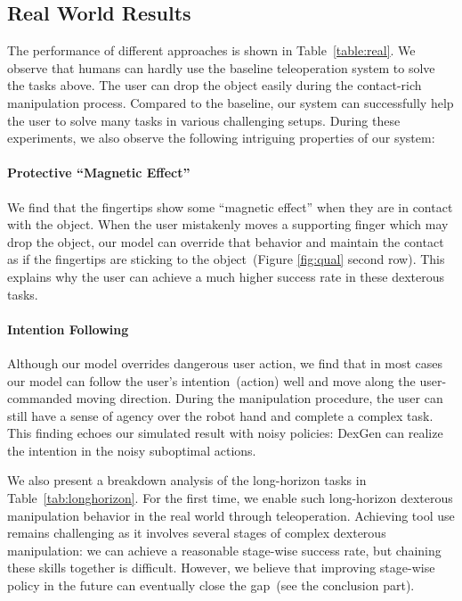 \subsection{Real World Results} The performance of different approaches is shown in Table~\ref{table:real}. We observe that humans can hardly use the baseline teleoperation system to solve the tasks above. The user can drop the object easily during the contact-rich manipulation process. Compared to the baseline, our system can successfully help the user to solve many tasks in various challenging setups. During these experiments, we also observe the following intriguing properties of our system:

\paragraph{Protective ``Magnetic Effect''} We find that the fingertips show some ``magnetic effect'' when they are in contact with the object. When the user mistakenly moves a supporting finger which may drop the object, our model can override that behavior and maintain the contact as if the fingertips are sticking to the object~(Figure \ref{fig:qual} second row). This explains why the user can achieve a much higher success rate in these dexterous tasks. 

\paragraph{Intention Following} Although our model overrides dangerous user action, we find that in most cases our model can follow the user's intention~(action) well and move along the user-commanded moving direction. During the manipulation procedure, the user can still have a sense of agency over the robot hand and complete a complex task. This finding echoes our simulated result with noisy policies: DexGen can realize the intention in the noisy suboptimal actions. 

We also present a breakdown analysis of the long-horizon tasks in Table~\ref{tab:longhorizon}. For the first time, we enable such long-horizon dexterous manipulation behavior in the real world through teleoperation. Achieving tool use remains challenging as it involves several stages of complex dexterous manipulation: we can achieve a reasonable stage-wise success rate, but chaining these skills together is difficult. However, we believe that improving stage-wise policy in the future can eventually close the gap~(see the conclusion part). 
